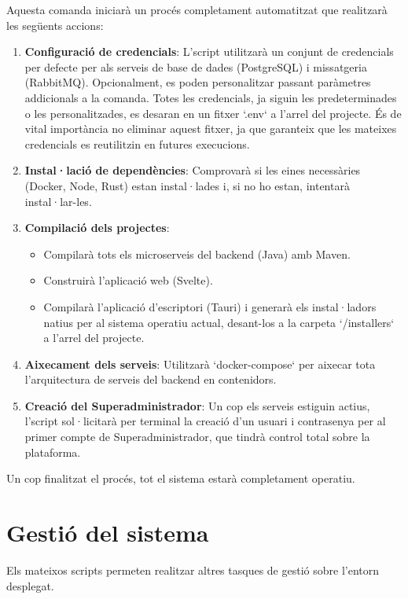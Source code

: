 Aquesta comanda iniciarà un procés completament automatitzat que realitzarà les següents accions:
\begin{enumerate}
    \item \textbf{Configuració de credencials}: L'script utilitzarà un conjunt de credencials per defecte per als serveis de base de dades (PostgreSQL) i missatgeria (RabbitMQ). Opcionalment, es poden personalitzar passant paràmetres addicionals a la comanda. Totes les credencials, ja siguin les predeterminades o les personalitzades, es desaran en un fitxer `.env` a l'arrel del projecte. És de vital importància no eliminar aquest fitxer, ja que garanteix que les mateixes credencials es reutilitzin en futures execucions.
    
    \item \textbf{Instal·lació de dependències}: Comprovarà si les eines necessàries (Docker, Node, Rust) estan instal·lades i, si no ho estan, intentarà instal·lar-les.
    
    \item \textbf{Compilació dels projectes}:
    \begin{itemize}
        \item Compilarà tots els microserveis del backend (Java) amb Maven.
        \item Construirà l'aplicació web (Svelte).
        \item Compilarà l'aplicació d'escriptori (Tauri) i generarà els instal·ladors natius per al sistema operatiu actual, desant-los a la carpeta `/installers` a l'arrel del projecte.
    \end{itemize}

    \item \textbf{Aixecament dels serveis}: Utilitzarà `docker-compose` per aixecar tota l'arquitectura de serveis del backend en contenidors.

    \item \textbf{Creació del Superadministrador}: Un cop els serveis estiguin actius, l'script sol·licitarà per terminal la creació d'un usuari i contrasenya per al primer compte de Superadministrador, que tindrà control total sobre la plataforma.
\end{enumerate}

Un cop finalitzat el procés, tot el sistema estarà completament operatiu.

\section{Gestió del sistema}
Els mateixos scripts permeten realitzar altres tasques de gestió sobre l'entorn desplegat.

